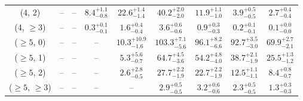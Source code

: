 \begin{table}[h!]
{\begin{tabular}{ccccccccc}
	(4, 2) & -- & -- & $8.4^{+ 1.1 }_{- 0.8 }$ & $22.6^{+ 1.4 }_{- 1.4 }$ & $40.2^{+ 2.0 }_{- 2.0 }$ & $11.9^{+ 1.1 }_{- 1.0 }$ & $3.9^{+ 0.5 }_{- 0.5 }$ & $2.7^{+ 0.4 }_{- 0.4 }$ \\[0.5ex] 
	(4, $\ge3$) & -- & -- & $0.3^{+ 0.1 }_{- 0.1 }$ & $1.6^{+ 0.4 }_{- 0.4 }$ & $3.6^{+ 0.6 }_{- 0.6 }$ & $0.9^{+ 0.3 }_{- 0.3 }$ & $0.2^{+ 0.1 }_{- 0.1 }$ & $0.1^{+ 0.0 }_{- 0.0 }$ \\[0.5ex] 
	($\ge5$, 0) & -- & -- & -- & $10.3^{+ 10.9 }_{- 1.6 }$ & $103.3^{+ 7.1 }_{- 5.6 }$ & $96.1^{+ 8.2 }_{- 6.6 }$ & $92.7^{+ 3.5 }_{- 3.0 }$ & $69.9^{+ 2.7 }_{- 2.1 }$ \\[0.5ex] 
	($\ge5$, 1) & -- & -- & -- & $5.3^{+ 5.6 }_{- 0.7 }$ & $64.7^{+ 4.5 }_{- 3.6 }$ & $54.2^{+ 4.8 }_{- 4.0 }$ & $38.7^{+ 2.1 }_{- 1.9 }$ & $25.5^{+ 1.3 }_{- 1.2 }$ \\[0.5ex] 
	($\ge5$, 2) & -- & -- & -- & $2.6^{+ 2.8 }_{- 0.5 }$ & $27.7^{+ 2.2 }_{- 1.9 }$ & $22.7^{+ 2.2 }_{- 1.9 }$ & $12.5^{+ 1.1 }_{- 1.1 }$ & $8.4^{+ 0.8 }_{- 0.7 }$ \\[0.5ex] 
	($\ge5$, $\ge3$) & -- & -- & -- & -- & $2.9^{+ 0.5 }_{- 0.5 }$ & $3.2^{+ 0.6 }_{- 0.6 }$ & $2.3^{+ 0.5 }_{- 0.5 }$ & $1.3^{+ 0.3 }_{- 0.3 }$ \\[0.5ex] 
	\hline
	\hline
\end{tabular}}
\end{table}

